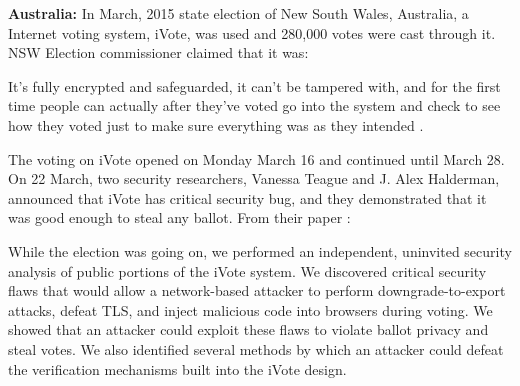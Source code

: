   
%  

 \textbf{Australia:}
  In March, 2015 state election 
  of New South Wales, Australia, a Internet voting system, iVote,    
  was used and 280,000 votes were cast through it. NSW Election 
  commissioner claimed that it was:
  
  \begin{displayquote} 
  It's fully encrypted and safeguarded, it can't be tampered with, 
 and for the first time people can actually after they've voted 
 go into the system and check to see how they voted just to make 
 sure everything was as they intended \citep{NSWelection}.
 \end{displayquote}
 

  \noindent
  The voting on iVote 
  opened on Monday March 16 and continued until March 28. On 22 March,
  two security researchers, Vanessa Teague and J. Alex Halderman, 
  announced that iVote has critical security bug, and they demonstrated 
  that it was good enough to steal any ballot. From their paper
  \citep{10.1007/978-3-319-22270-7_3}:
  
  \begin{displayquote}
  
  
   While the election was going on, we performed an independent,
   uninvited security analysis of public portions of the iVote 
   system. We discovered critical security flaws that would allow
   a network-based attacker to perform downgrade-to-export 
   attacks, defeat TLS, and inject malicious code 
   into browsers during voting. We showed that an attacker could
   exploit these flaws to violate ballot privacy and steal votes. 
   We also identified several methods by which an attacker could
   defeat the verification mechanisms built into the iVote design.
   
   \end{displayquote}
  
